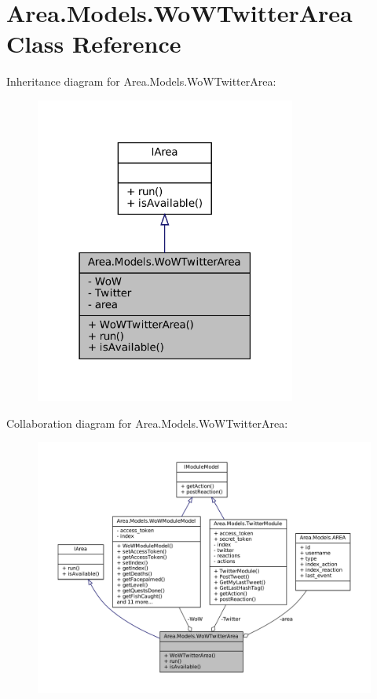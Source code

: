 \hypertarget{classArea_1_1Models_1_1WoWTwitterArea}{}\section{Area.\+Models.\+Wo\+W\+Twitter\+Area Class Reference}
\label{classArea_1_1Models_1_1WoWTwitterArea}


Inheritance diagram for Area.\+Models.\+Wo\+W\+Twitter\+Area\+:
\nopagebreak
\begin{figure}[H]
\begin{center}
\leavevmode
\includegraphics[width=243pt]{classArea_1_1Models_1_1WoWTwitterArea__inherit__graph}
\end{center}
\end{figure}


Collaboration diagram for Area.\+Models.\+Wo\+W\+Twitter\+Area\+:
\nopagebreak
\begin{figure}[H]
\begin{center}
\leavevmode
\includegraphics[width=350pt]{classArea_1_1Models_1_1WoWTwitterArea__coll__graph}
\end{center}
\end{figure}
